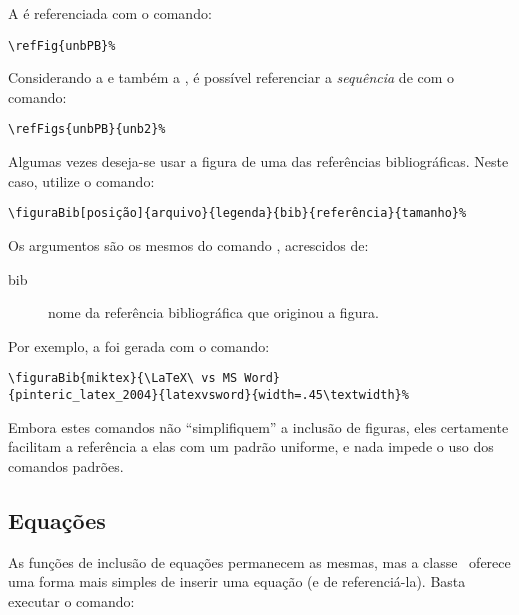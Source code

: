 A  é referenciada com o comando:
\begin{verbatim}
\refFig{unbPB}%
\end{verbatim}

%

Considerando a  e também a , é possível referenciar
a \emph{sequência} de  com o comando:
\begin{verbatim}
\refFigs{unbPB}{unb2}%
\end{verbatim}

Algumas vezes deseja-se usar a figura de uma das referências bibliográficas. Neste caso, utilize o comando:

\begin{verbatim}
\figuraBib[posição]{arquivo}{legenda}{bib}{referência}{tamanho}%
\end{verbatim}

Os argumentos são os mesmos do comando , acrescidos de:
\begin{description}
\item[bib] nome da referência bibliográfica que originou a figura.
\end{description}

Por exemplo, a  foi gerada com o comando:
\begin{verbatim}
\figuraBib{miktex}{\LaTeX\ vs MS Word}
{pinteric_latex_2004}{latexvsword}{width=.45\textwidth}%
\end{verbatim}

Embora estes comandos não ``simplifiquem'' a inclusão de figuras, eles
certamente facilitam a referência a elas com um padrão uniforme, e nada impede o
uso dos comandos padrões.

%



\subsection{Equações}
As funções de inclusão de equações permanecem as mesmas, mas a classe \unbcic\
oferece uma forma mais simples de inserir uma equação (e de referenciá-la). Basta
executar o comando:


